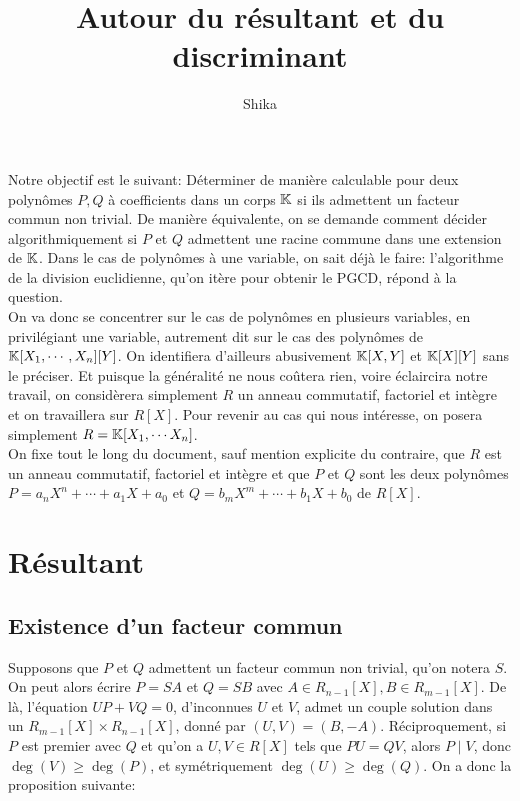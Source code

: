\documentclass{article}
\title{Autour du résultant et du discriminant}
\author{Shika}
\date{}
\begin{document}
\maketitle

Notre objectif est le suivant: Déterminer de manière calculable pour deux polynômes $P, Q$ à coefficients dans un corps $\mathbb{K}$ si ils admettent un facteur commun non trivial. De manière équivalente, on se demande comment décider algorithmiquement si $P$ et $Q$ admettent une racine commune dans une extension de $\mathbb{K}$.
Dans le cas de polynômes à une variable, on sait déjà le faire: l'algorithme de la division euclidienne, qu'on itère pour obtenir le PGCD, répond à la question.\\
On va donc se concentrer sur le cas de polynômes en plusieurs variables, en privilégiant une variable, autrement dit sur le cas des polynômes de $\mathbb{K}[X_1, \cdots, X_n][Y]$. On identifiera d'ailleurs abusivement $\mathbb{K}[X, Y]$ et $\mathbb{K}[X][Y]$ sans le préciser. Et puisque la généralité ne nous coûtera rien, voire éclaircira notre travail, on considèrera simplement $R$ un anneau commutatif, factoriel et intègre et on travaillera sur $R[X]$. Pour revenir au cas qui nous intéresse, on posera simplement $R = \mathbb{K}[X_1, \cdots X_n]$.\\

On fixe tout le long du document, sauf mention explicite du contraire, que $R$ est un anneau commutatif, factoriel et intègre et que $P$ et $Q$ sont les deux polynômes $P = a_nX^n + \cdots + a_1X + a_0$ et $Q = b_mX^m + \cdots + b_1X + b_0$ de $R[X]$.\\

\section{Résultant}

\subsection{Existence d'un facteur commun}

Supposons que $P$ et $Q$ admettent un facteur commun non trivial, qu'on notera $S$. On peut alors écrire $P = SA$ et $Q = SB$ avec $A \in R_{n-1}[X], B \in R_{m-1}[X]$.
De là, l'équation $UP + VQ = 0$, d'inconnues $U$ et $V$, admet un couple solution dans un $R_{m-1}[X] \times R_{n-1}[X]$, donné par $(U, V) = (B, -A)$. Réciproquement, si $P$ est premier avec $Q$ et qu'on a $U, V \in R[X]$ tels que $PU = QV$, alors $P \mid V$, donc $\deg(V) \geq \deg(P)$, et symétriquement $\deg(U) \geq \deg(Q)$. On a donc la proposition suivante:
\end{document}
